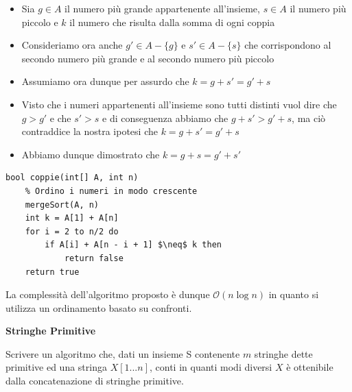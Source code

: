 \documentclass[../cheatSheetAlgoritmi.tex]{subfiles}
\begin{document}
\begin{itemize}
	\item Sia $g \in A$ il numero più grande appartenente all'insieme, $s \in A$ il numero più piccolo e $k$ il numero che risulta dalla somma di ogni coppia
	\item Consideriamo ora anche $g' \in A - \{g\}$ e $s' \in A - \{s\}$ che corrispondono al secondo numero più grande e al secondo numero più piccolo
	\item Assumiamo ora dunque per assurdo che $k = g + s' = g' + s$
	\item Visto che i numeri appartenenti all'insieme sono tutti distinti vuol dire che $g > g'$ e che $s' > s$ e di conseguenza abbiamo che $g + s' > g' + s$, ma ciò contraddice la nostra ipotesi che $k = g + s' = g' + s$
	\item Abbiamo dunque dimostrato che $k = g + s = g' + s'$ 
\end{itemize}
\begin{lstlisting}[caption=2-partition (Coppie)]
bool coppie(int[] A, int n)
	% Ordino i numeri in modo crescente
	mergeSort(A, n)
	int k = A[1] + A[n]
	for i = 2 to n/2 do
		if A[i] + A[n - i + 1] $\neq$ k then
			return false
	return true
\end{lstlisting}
La complessità dell'algoritmo proposto è dunque $\mathcal{O}(n \log n)$ in quanto si utilizza un ordinamento basato su confronti.

\textbf{Stringhe Primitive}

Scrivere un algoritmo che, dati un insieme S contenente $m$ stringhe dette primitive ed una stringa $X[1. . . n]$, conti in quanti modi diversi $X$ è ottenibile dalla concatenazione di stringhe primitive. 

\bigskip
\end{document}
